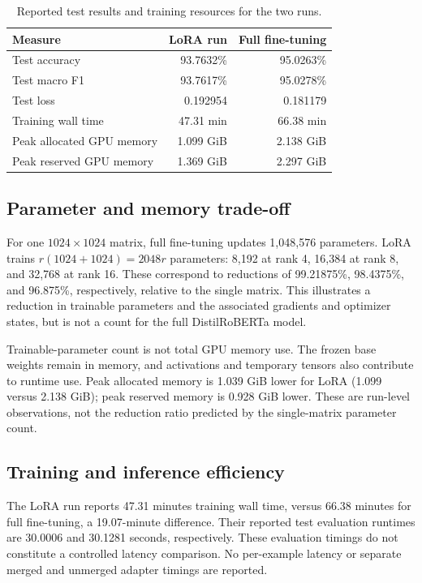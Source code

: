 \begin{table}[htbp]
\centering\small
\caption{Reported test results and training resources for the two runs.}
\label{tab:run-comparison}
\begin{tabular}{lrr}
\toprule
Measure & LoRA run & Full fine-tuning \\
\midrule
Test accuracy & 93.7632\% & 95.0263\% \\
Test macro F1 & 93.7617\% & 95.0278\% \\
Test loss & 0.192954 & 0.181179 \\
Training wall time & 47.31 min & 66.38 min \\
Peak allocated GPU memory & 1.099 GiB & 2.138 GiB \\
Peak reserved GPU memory & 1.369 GiB & 2.297 GiB \\
\bottomrule
\end{tabular}
\end{table}

\subsection{Parameter and memory trade-off}

For one $1024\times1024$ matrix, full fine-tuning updates 1,048,576
parameters. LoRA trains $r(1024+1024)=2048r$ parameters: 8,192 at rank 4,
16,384 at rank 8, and 32,768 at rank 16. These correspond to reductions
of 99.21875\%, 98.4375\%, and 96.875\%, respectively, relative to the
single matrix. This illustrates a reduction in trainable parameters and
the associated gradients and optimizer states, but is not a count for
the full DistilRoBERTa model.

Trainable-parameter count is not total GPU memory use. The frozen base
weights remain in memory, and activations and temporary tensors also
contribute to runtime use. Peak allocated memory is 1.039 GiB lower for
LoRA (1.099 versus 2.138 GiB); peak reserved memory is 0.928 GiB lower.
These are run-level observations, not the reduction ratio predicted by
the single-matrix parameter count.

\subsection{Training and inference efficiency}

The LoRA run reports 47.31 minutes training wall time, versus 66.38
minutes for full fine-tuning, a 19.07-minute difference. Their reported
test evaluation runtimes are 30.0006 and 30.1281 seconds, respectively.
These evaluation timings do not constitute a controlled latency
comparison. No per-example latency or separate merged and unmerged
adapter timings are reported.

